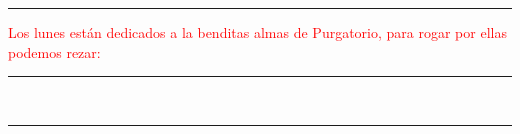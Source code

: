 \documentclass[10pt,twoside]{book}
\begin{document}
\vspace{0.5em}



\vspace{0.5em}



\vspace{0.75em}





\vspace{0.75em}





\vspace{0.75em}





\vspace{0.75em}





\iralfinal

\begin{center}
      {\rule{10em}{0.4pt}}

      \vspace{0.75em}

      \textcolor{red}{Los lunes están dedicados a la benditas almas de Purgatorio, para rogar por ellas podemos rezar:}
\end{center}

\begin{multicols}{2}

      

\end{multicols}

\begin{center}
      \begin{spacing}{0.25}
            {\rule{20em}{0.4pt}}\\
            {\rule{20em}{0.4pt}}
      \end{spacing}
\end{center}

\end{document}
